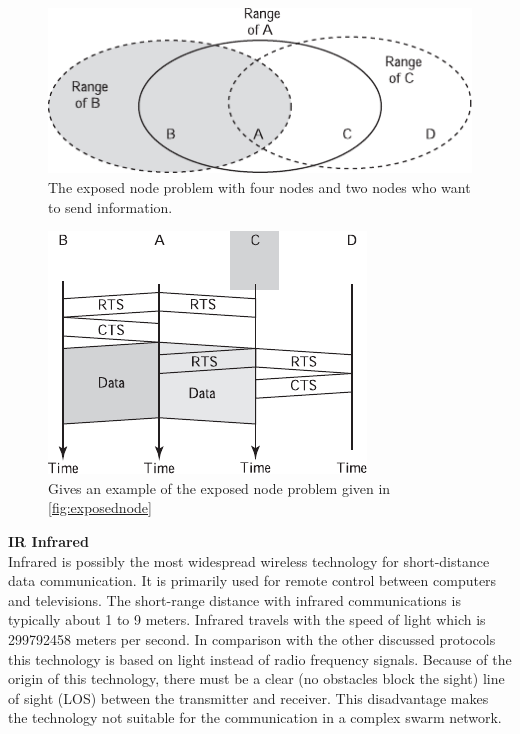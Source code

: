 \documentclass[10pt,a4paper]{article}
\begin{document}
\begin{figure}[H]
   \centering
   \includegraphics[width=1\textwidth]{exposedstation}
   \caption{The exposed node problem with four nodes and two nodes who want to send information.}
   \label{fig:exposedstation}
\end{figure}

\begin{figure}[H]
   \centering
   \includegraphics[width=.75\textwidth]{rtscts2}
   \caption{Gives an example of the exposed node problem given in \ref{fig:exposednode}}
   \label{fig:rtts2}
\end{figure}

\textbf{\large IR Infrared}\\
Infrared is possibly the most widespread wireless technology for short-distance data communication. \cite{combook} It is primarily used for remote control between computers and televisions. The short-range distance with infrared communications is typically about 1 to 9 meters. \cite{combook} Infrared travels with the speed of light which is 299792458 meters per second. \cite{speedoflight} In comparison with the other discussed protocols this technology is based on light instead of radio frequency signals. Because of the origin of this technology, there must be a clear (no obstacles block the sight) line of sight (LOS) between the transmitter and receiver. This disadvantage makes the technology not suitable for the communication in a complex swarm network.
\end{document}
